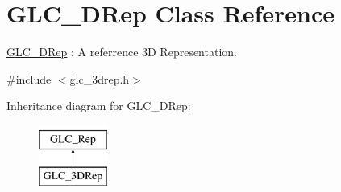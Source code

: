 \hypertarget{class_g_l_c__3_d_rep}{\section{G\-L\-C\-\_\-D\-Rep Class Reference}
\label{class_g_l_c__3_d_rep}
}


\hyperlink{class_g_l_c__3_d_rep}{G\-L\-C\-\_\-D\-Rep} \-: A referrence 3\-D Representation.  




{\ttfamily \#include $<$glc\-\_\-3drep.\-h$>$}

Inheritance diagram for G\-L\-C\-\_\-D\-Rep\-:\begin{figure}[H]
\begin{center}
\leavevmode
\includegraphics[height=2.000000cm]{class_g_l_c__3_d_rep}
\end{center}
\end{figure}

